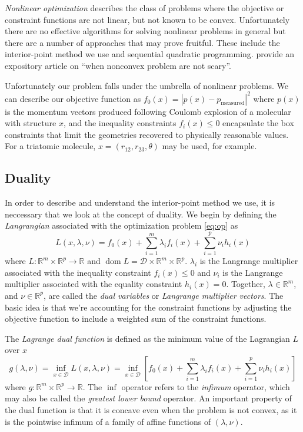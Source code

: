 \emph{Nonlinear optimization} describes the class of problems where the objective or constraint functions are not linear, but not known to be convex. Unfortunately there are no effective algorithms for solving nonlinear problems in general but there are a number of approaches that may prove fruitful. These include the interior-point method we use and sequential quadratic programming. \citet{Sun15} provide an expository article on ``when nonconvex problem are not scary''.

Unfortunately our problem falls under the umbrella of nonlinear problems. We can describe our objective function as $f_0(x) = |p(x)-p_\textrm{measured}|^2$ where $p(x)$ is the momentum vectors produced following Coulomb explosion of a molecular with structure $x$, and the inequality constraints $f_i(x) \leq 0$ encapsulate the box constraints that limit the geometries recovered to physically reasonable values. For a triatomic molecule, $x = (r_{12}, r_{23}, \theta)$ may be used, for example.


\subsection{Duality}
In order to describe and understand the interior-point method we use, it is neccessary that we look at the concept of duality. We begin by defining the \emph{Langrangian} associated with the optimization problem \eqref{eq:op} as
\begin{equation}
L(x, \lambda, \nu) = f_0(x) + \sum_{i=1}^m \lambda_i f_i(x)
+ \sum_{i=1}^p \nu_i h_i(x)
\end{equation}
where $L: \mathbb{R}^m \times \mathbb{R}^p \rightarrow \mathbb{R}$ and $\operatorname{dom} L = \mathcal{D} \times \mathbb{R}^m \times \mathbb{R}^p$. $\lambda_i$ is the Langrange multiplier associated with the inequality constraint $f_i(x) \leq 0$ and $\nu_i$ is the Langrange multiplier associated with the equality constraint $h_i(x) = 0$. Together, $\lambda \in \mathbb{R}^m$, and $\nu \in \mathbb{R}^p$, are called the \emph{dual variables} or \emph{Langrange multiplier vectors}. The basic idea is that we're accounting for the constraint functions by adjusting the objective function to include a weighted sum of the constraint functions.

The \emph{Lagrange dual function} is defined as the minimum value of the Lagrangian $L$ over $x$
\begin{equation}
g(\lambda, \nu) = \inf_{x \in \mathcal{D}} L(x, \lambda, \nu)
= \inf_{x \in \mathcal{D}} \left[ f_0(x) + \sum_{i=1}^m \lambda_i f_i(x)
+ \sum_{i=1}^p \nu_i h_i(x) \right]
\end{equation}
where $g: \mathbb{R}^m \times \mathbb{R}^p \rightarrow \mathbb{R}$. The $\inf$ operator refers to the \emph{infimum} operator, which may also be called the  \emph{greatest lower bound} operator. An important property of the dual function is that it is concave even when the problem is not convex, as it is the pointwise infimum of a family of affine functions of $(\lambda, \nu)$.

